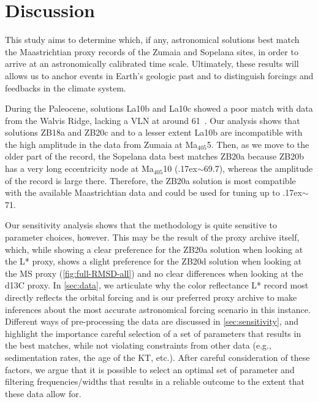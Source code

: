 \documentclass[draft]{agujournal2019}
\newcommand{\appr}{\raise.17ex\hbox{\(\scriptstyle\sim\)}} %
\newcommand{\ma}[1]{Ma\(_{405}\)#1} %
\begin{document}
\section{Discussion}\label{sec:discussion}

This study aims to determine which, if any, astronomical solutions best match the Maastrichtian proxy records of the Zumaia and Sopelana sites, in order to arrive at an astronomically calibrated time scale.
Ultimately, these results will allows us to anchor events in Earth's geologic past and to distinguish forcings and feedbacks in the climate system.

During the Paleocene, solutions La10b and La10c showed a poor match with data from the Walvis Ridge, lacking a \gls{VLN} at around \qty{61}{\millionyearago}~\cite{ZeebeLourens2022EPSL}.
Our analysis shows that solutions ZB18a and ZB20c and to a lesser extent La10b are incompatible with the high amplitude in the data from Zumaia at \ma{5}.
Then, as we move to the older part of the record, the Sopelana data best matches ZB20a because ZB20b has a very long eccentricity node at \ma{10} (\appr\qty{69.7}{\millionyearago}), whereas the amplitude of the record is large there.
Therefore, the ZB20a solution is most compatible with the available Maastrichtian data and could be used for tuning up to \appr\qty{71}{\millionyearago}.

Our sensitivity analysis shows that the methodology is quite sensitive to parameter choices, however.
This may be the result of the proxy archive itself, which, while showing a clear preference for the ZB20a solution when looking at the \gls{L*} proxy, shows a slight preference for the ZB20d solution when looking at the \gls{MS} proxy (\cref{fig:full-RMSD-all}) and no clear differences when looking at the \gls{d13C} proxy.
In \cref{sec:data}, we articulate why the color reflectance \gls{L*} record most directly reflects the orbital forcing and is our preferred proxy archive to make inferences about the most accurate astronomical forcing scenario in this instance.
Different ways of pre-processing the data are discussed in \cref{sec:sensitivity}, and highlight the importance careful selection of a set of parameters that results in the best matches, while not violating constraints from other data (e.g., sedimentation rates, the age of the \gls{KT}, etc.).
After careful consideration of these factors, we argue that it is possible to select an optimal set of parameter and filtering frequencies/widths that results in a reliable outcome to the extent that these data allow for.
\end{document}

